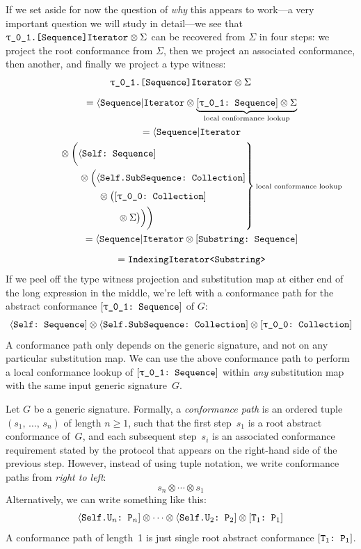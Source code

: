 \documentclass[../generics]{subfiles}
\begin{document}
\begin{example}
If we set aside for now the question of \emph{why} this appears to work---a very important question we will study in detail---we see that $\texttt{\rU.[Sequence]Iterator}\otimes\Sigma$ can be recovered from $\Sigma$ in four steps: we project the root conformance from $\Sigma$, then we project an associated conformance, then another, and finally we project a type witness:
\begin{gather*}
\texttt{\rU.[Sequence]Iterator} \otimes \Sigma\\[\medskipamount]
\qquad {} = \AIterator \otimes \underbrace{\rUSequence \otimes \Sigma}_{\text{\scriptsize local conformance lookup}}\\
\qquad {} = \AIterator\\
\qquad \qquad \begin{rcases*}
{} \otimes \biggl(\SelfSequence\\
\qquad {} \otimes \Bigl(\SelfSubSequence\\
\qquad \qquad {} \otimes \bigl(\rTCollection\\
\qquad \qquad \qquad {} \otimes \Sigma\bigr)\Bigr)\biggr)
\end{rcases*}\text{\scriptsize local conformance lookup}\\
\qquad {} = \AIterator \otimes \SubstringSequence\\[\medskipamount]
\qquad {} = \texttt{IndexingIterator<Substring>}
\end{gather*}
%
If we peel off the type witness projection and substitution map at either end of the long expression in the middle, we're left with a conformance path for the abstract conformance $\rUSequence$ of $G$:
\[\SelfSequence \otimes \SelfSubSequence \otimes \rTCollection\]
A conformance path only depends on the generic signature, and not on any particular substitution map. We can use the above conformance path to perform a local conformance lookup of $\rUSequence$ within \emph{any} substitution map with the same input generic signature~$G$.
\end{example}

\begin{definition}\label{conformance path def}
Let $G$ be a generic signature. Formally, a \emph{conformance path} is an ordered tuple $(s_1,\,\ldots,\,s_n)$ of length $n \geq 1$, such that the first step~$s_1$ is a root abstract conformance of~$G$, and each subsequent step~$s_i$ is an associated conformance requirement stated by the protocol that appears on the right-hand side of the previous step. However, instead of using tuple notation, we write conformance paths from \emph{right to left}:
\[s_n\otimes\cdots \otimes s_1\]
Alternatively, we can write something like this:
\[\langle\texttt{Self.$\texttt{U}_n$:~$\texttt{P}_n$}] \otimes \cdots \otimes \langle\texttt{Self.$\texttt{U}_2$:~$\texttt{P}_2$}] \otimes [\texttt{$\texttt{T}_1$:~$\texttt{P}_1$}] \]
A conformance path of length~1 is just single root abstract conformance $[\texttt{$\texttt{T}_1$:~$\texttt{P}_1$}]$.
\end{definition}
\end{document}
